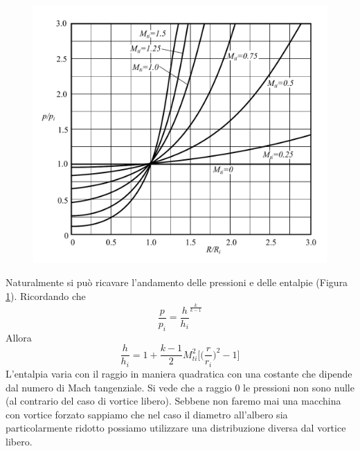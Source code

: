 \begin{figure}
\centering
  \includegraphics[width=.8\textwidth]{fig/PVortForz.pdf}
\caption{}
\label{fig:PVortForz}
\end{figure}
Naturalmente si può ricavare l'andamento delle pressioni e delle entalpie (Figura \ref{fig:PVortForz}). Ricordando che
\begin{equation}
\frac{p}{p_i} = \frac{h}{h_i}^{\frac{k}{k-1}}
\end{equation}
Allora
\begin{equation}
\frac{h}{h_i} = 1 + \frac{k-1}{2} M_{ti}^2 \bigg[ \bigg(\frac{r}{r_i} \bigg)^2-1 \bigg]
\end{equation}
L'entalpia varia con il raggio in maniera quadratica con una costante che dipende dal numero di Mach tangenziale. Si vede che a raggio $0$ le pressioni non sono nulle (al contrario del caso di vortice libero). Sebbene non faremo mai una macchina con vortice forzato sappiamo che nel caso il diametro all'albero sia particolarmente ridotto possiamo utilizzare una distribuzione diversa dal vortice libero. 

